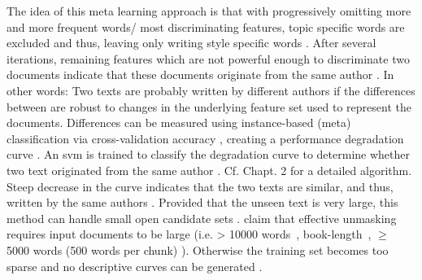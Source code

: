 \begin{definition}
    [Unmasking]
    The idea of this meta learning approach is that with progressively omitting more and more frequent words/ 
    most discriminating features, 
    topic specific words are excluded and thus, leaving only writing style specific words \cite{stein_intrinsic_2011}.
    After several iterations, remaining features which are not powerful enough to discriminate two documents indicate that 
    these documents originate from the same author \cite{stein_intrinsic_2011,tyo_state_2022,bevendorff_divergence_based_2020,koppel_authorship_2004}.
    In other words: 
    Two texts are probably written by different authors if the differences between are robust to changes in the underlying feature set used to represent the documents.
    Differences can be measured using instance-based (meta) classification via cross-validation accuracy 
    \cite{koppel_authorship_2011,bevendorff_generalizing_2019,bevendorff_divergence_based_2020,potthast_stylometric_2018,koppel_authorship_2004}, 
    creating a performance degradation curve \cite{tyo_state_2022,koppel_authorship_2004}.
    An \ac{svm} is trained to classify the degradation curve to determine whether two text originated from the same author 
    \cite{tyo_state_2022,bevendorff_generalizing_2019,koppel_authorship_2004}.
    Cf. \cite{bevendorff_divergence_based_2020} Chapt. 2 for a detailed algorithm.
    Steep decrease in the curve indicates that the two texts are similar, and thus, 
    written by the same authors \cite{potthast_stylometric_2018,koppel_authorship_2004}.
    Provided that the unseen text is very large, this method can handle small open candidate sets \cite{koppel_authorship_2011}.
    \citet{koppel_determining_2014,bevendorff_generalizing_2019} claim that effective unmasking requires input documents to be large 
    (i.e. > 10000 words~\cite{koppel_determining_2014}, book-length~\cite{bevendorff_generalizing_2019}, 
    $\geq$ 5000 words (500 words per chunk) \cite{bevendorff_divergence_based_2020}).
    Otherwise the training set becomes too sparse and no descriptive curves can be generated 
    \cite{bevendorff_generalizing_2019,bevendorff_divergence_based_2020}.
\end{definition}

